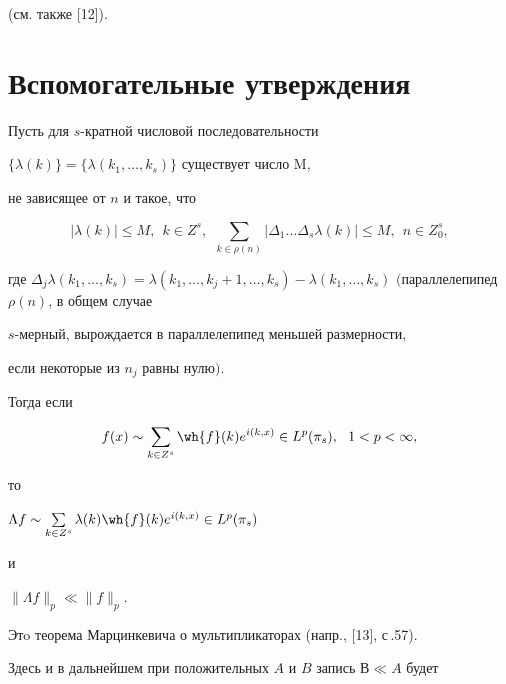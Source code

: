 (см. также [12]). 








\section{Вспомогательные утверждения}





\begin{lem}


Пусть для $s$-кратной числовой последовательности 


$\{\lambda(k)\}=\{ \lambda(k_1,\dotsc,k_s)\}$ существует число M,


не зависящее от $n$ и такое, что 


$$


|\lambda(k)|\leq M,\ \  k\in Z^s,\ \ \sum_{k\in \rho 


(n)}|\Delta_1\dotsc\Delta_s\lambda(k)| \leq M, \ \ n\in Z^s_0,


$$


где $\Delta_j \lambda(k_1,\dotsc,k_s)=\lambda(k_1,\dotsc,k_j+1,\dotsc,k_s)-


\lambda(k_1,\dotsc,k_s)$ $($параллелепипед $\rho(n)$, в общем случае


$s$-мерный, вырождается в параллелепипед меньшей размерности,


если некоторые из $n_j$ равны нулю$)$. 


Тогда если 


$$


f(x)\sim \sum_{k\in Z^s}\wh{f}(k)e^{i( k, x)} \in L^p(\pi_s), 


\ \ 1<p<\infty,


$$


то 


$\Lambda f \sim \sum\limits_{k\in Z^s}\lambda( k)


\wh{f}(k)e^{i(k, x)}\in L^p(\pi_s)$ 


и 


$\|\Lambda f \|_p \ll \|f\|_p$.


\end{lem}


 


Этo теорема Марцинкевича о мультипликаторах (напр., [13], с\,.57).





Здесь и в дальнейшем при положительных $A$ и $B$ запись $В \ll A$ будет 



